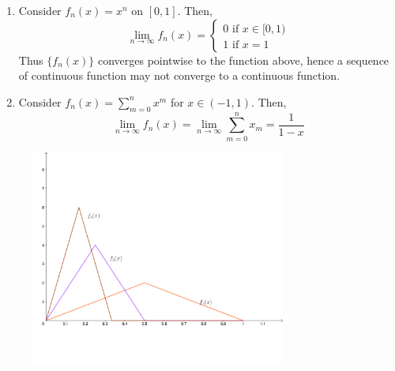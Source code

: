 \begin{enumerate}
    \item Consider $f_n(x) = x^n$ on $[0,1]$. Then,
        \begin{equation*}
            \lim \limits_{n \to \infty} f_n(x) = \begin{cases}
                0 \text{ if } x \in [0,1) \\
                1 \text{ if } x=1
            \end{cases}
        \end{equation*}
        Thus $\{f_n(x)\}$ converges pointwise to the function above, hence a sequence of continuous function may not converge to a continuous function.
    \item Consider $f_n(x) = \sum_{m=0}^n x^m$ for $x \in (-1,1)$. Then,
        \begin{equation*}
            \lim \limits_{n \to \infty} f_n(x) = \lim \limits_{n \to \infty} \sum \limits_{m=0}^n x_m = \frac{1}{1-x}
        \end{equation*}
\end{enumerate}

\begin{figure}[H]
    \centering
    \includegraphics[width=0.75\textwidth]{images/06_sequence_functions.pdf}
    \centering
\end{figure}
